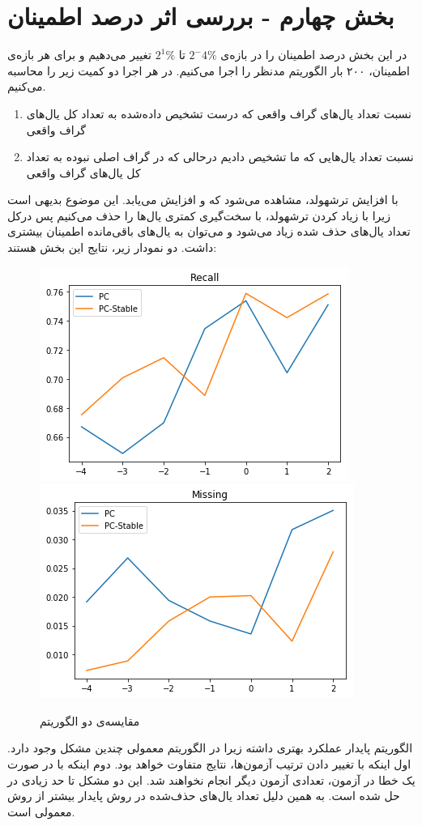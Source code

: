 \documentclass{article}
\begin{document}
\section{بخش چهارم - بررسی اثر درصد اطمینان}
در این بخش درصد اطمینان را در بازه‌ی 
$2^-4\%$
تا 
$2^1\%$
تغییر می‌دهیم و برای هر بازه‌ی اطمینان، ۲۰۰ بار الگوریتم مدنظر را اجرا می‌کنیم. در هر اجرا دو کمیت زیر را محاسبه می‌کنیم.
\begin{enumerate}
	\item {}
	نسبت تعداد‌ یال‌های گراف واقعی که درست تشخیص داده‌شده به  تعداد کل یال‌های گراف واقعی
	\item {}
	نسبت تعداد یال‌هایی که ما تشخیص دادیم درحالی که در گراف اصلی نبوده به  تعداد کل یال‌های گراف واقعی
\end{enumerate}

با افزایش ترشهولد، مشاهده می‌شود که 
و
افزایش می‌یابد. این موضوع بدیهی است زیرا با زیاد کردن ترشهولد، با سخت‌گیری کمتری یال‌ها را حذف می‌کنیم پس در‌کل تعداد یال‌های حذف شده زیاد‌ می‌شود و می‌توان به یال‌های باقی‌مانده اطمینان بیشتری داشت. دو نمودار زیر، نتایج این بخش هستند:

\begin{figure}[h]
	\begin{floatrow}
		\centering
		\includegraphics[scale=0.451]{plt1.png}
		\includegraphics[scale=0.451]{plt2.png}
	\end{floatrow}
	\caption{مقایسه‌ی دو الگوریتم}
	\label{wait}
\end{figure}
الگوریتم پایدار عملکرد بهتری داشته زیرا در الگوریتم 
معمولی چندین مشکل وجود دارد. اول اینکه با تغییر دادن ترتیب آزمون‌ها، نتایج متفاوت خواهد بود. دوم اینکه با در صورت یک خطا در آزمون، تعدادی آزمون دیگر انجام نخواهند شد. این دو مشکل تا حد زیادی در 
حل شده است. به همین دلیل تعداد یال‌های حذف‌شده در روش پایدار بیشتر از روش معمولی است.
\end{document}
